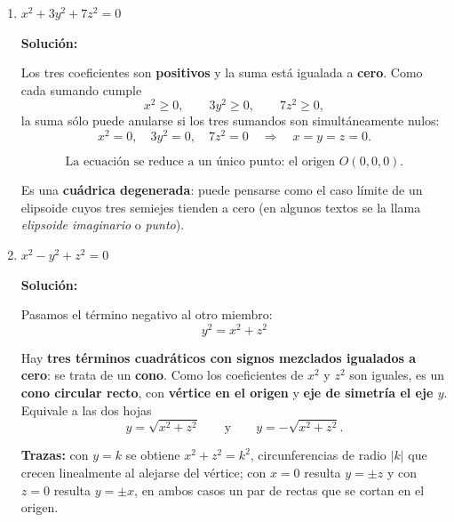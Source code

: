 \documentclass[12pt]{article}
\newcommand{\solucion}{%
    \vspace{0.8em}%
    \textbf{Solución:}%
    \vspace{0.8em}%
}
\begin{document}
\begin{enumerate}[label=\alph*.-]
    \item $x^{2}+3y^{2}+7z^{2}=0$

    \solucion

    Los tres coeficientes son \textbf{positivos} y la suma está igualada a
    \textbf{cero}. Como cada sumando cumple
    \[
    x^{2}\ge 0,
    \qquad
    3y^{2}\ge 0,
    \qquad
    7z^{2}\ge 0,
    \]
    la suma sólo puede anularse si los tres sumandos son simultáneamente nulos:
    \[
    x^{2}=0,\quad 3y^{2}=0,\quad 7z^{2}=0
    \quad\Longrightarrow\quad
    x=y=z=0 .
    \]

    \[
    \boxed{
    \text{La ecuación se reduce a un único punto: el origen }O(0,0,0).
    }
    \]

    Es una \textbf{cuádrica degenerada}: puede pensarse como el caso límite de
    un elipsoide cuyos tres semiejes tienden a cero (en algunos textos se la
    llama \emph{elipsoide imaginario} o \emph{punto}).

    \begin{center}
    \end{center}

    \item $x^{2}-y^{2}+z^{2}=0$

    \solucion

    Pasamos el término negativo al otro miembro:
    \[
    \boxed{
    y^{2}=x^{2}+z^{2}
    }
    \]

    Hay \textbf{tres términos cuadráticos con signos mezclados igualados a
    cero}: se trata de un \textbf{cono}. Como los coeficientes de $x^{2}$ y
    $z^{2}$ son iguales, es un \textbf{cono circular recto}, con
    \textbf{vértice en el origen} y \textbf{eje de simetría el eje $y$}.
    Equivale a las dos hojas
    \[
    y=\sqrt{x^{2}+z^{2}}
    \qquad\text{y}\qquad
    y=-\sqrt{x^{2}+z^{2}} .
    \]

    \textbf{Trazas:} con $y=k$ se obtiene $x^{2}+z^{2}=k^{2}$, circunferencias
    de radio $|k|$ que crecen linealmente al alejarse del vértice; con $x=0$
    resulta $y=\pm z$ y con $z=0$ resulta $y=\pm x$, en ambos casos un par de
    rectas que se cortan en el origen.


\end{enumerate}
\end{document}
